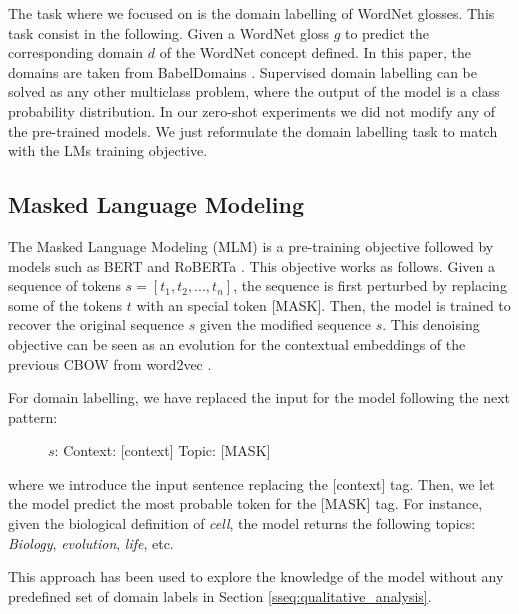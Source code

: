 \documentclass[11pt]{article}
\begin{document}
The task where we focused on is the domain labelling of WordNet glosses. This task consist in the following. Given a WordNet gloss $g$ to predict the corresponding domain $d$ of the WordNet concept defined. In this paper, the domains are taken from BabelDomains \cite{camacho2017}. Supervised domain labelling can be solved as any other multiclass problem, where the output of the model is a class probability distribution. In our zero-shot experiments we did not modify any of the pre-trained models. We just reformulate the domain labelling task to match with the LMs training objective.



\subsection{Masked Language Modeling}
\label{masked-language-model}

The Masked Language Modeling (MLM) is a pre-training objective followed by models such as BERT \cite{bert} and RoBERTa \cite{ROBERTA}. This objective works as follows. Given a sequence of tokens $s = [t_1, t_2, ..., t_n]$, the sequence is first perturbed by replacing some of the tokens $t$ with an special token [MASK]. Then, the model is trained to recover the original sequence $s$ given the modified sequence $\hat s$. This denoising objective can be seen as an evolution for the contextual embeddings of the previous CBOW from word2vec \cite{cbow}.

For domain labelling, we have replaced the input for the model following the next pattern:

\begin{figure}[!ht]
    \centering
    \begin{displayquote}
        $s$: Context: [context] Topic: [MASK]
    \end{displayquote}
    \label{fig:mlm_example}
\end{figure}

\noindent where we introduce the input sentence replacing the [context] tag. Then, we let the model predict the most probable token for the [MASK] tag. For instance, given the biological definition of {\it cell}, the model returns the following topics: {\it Biology}, {\it evolution}, {\it life}, etc.

This approach has been used to explore the knowledge of the model without any predefined set of domain labels in Section \ref{sseq:qualitative_analysis}.
\end{document}
